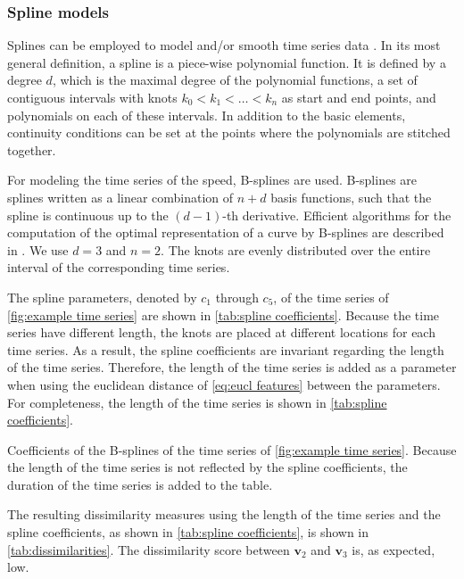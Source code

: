 \documentclass[10pt,final,a4paper,oneside,onecolumn]{article}
\newcommand{\profile}[1]{\textbf{v}_{#1}}
\theoremstyle{plain}\newtheorem{definition}{Definition}[section]    %
\theoremstyle{definition}\newtheorem{example}{Example}[section]     %
\theoremstyle{remark}\newtheorem{remarkenv}{Remark}[section]        %
\begin{document}
\subsubsection{Spline models}
\label{sec:spline models}

Splines can be employed to model and/or smooth time series data \cite{dierckx1993splines, deboor1978practical}. In its most general definition, a spline is a piece-wise polynomial function. It is defined by a degree $d$, which is the maximal degree of the polynomial functions, a set of contiguous intervals with knots $k_0 < k_1 < \ldots < k_n$ as start and end points, and polynomials on each of these intervals. In addition to the basic elements, continuity conditions can be set at the points where the polynomials are stitched together. 

For modeling the time series of the speed, B-splines are used. B-splines are splines written as a linear combination of $n+d$ basis functions, such that the spline is continuous up to the $(d-1)$-th derivative. Efficient algorithms for the computation of the optimal representation of a curve by B-splines are described in \cite{dierckx1993splines}. We use $d=3$ and $n=2$. The knots are evenly distributed over the entire interval of the corresponding time series.

The spline parameters, denoted by $c_1$ through $c_5$, of the time series of \cref{fig:example time series} are shown in \cref{tab:spline coefficients}. Because the time series have different length, the knots are placed at different locations for each time series. As a result, the spline coefficients are invariant regarding the length of the time series. Therefore, the length of the time series is added as a parameter when using the euclidean distance of \cref{eq:eucl features} between the parameters. For completeness, the length of the time series is shown in \cref{tab:spline coefficients}. 


\begin{table}
	\centering
	\caption{Coefficients of the B-splines of the time series of \cref{fig:example time series}. Because the length of the time series is not reflected by the spline coefficients, the duration of the time series is added to the table.}
	\label{tab:spline coefficients}
	
\end{table}

The resulting dissimilarity measures using the length of the time series and the spline coefficients, as shown in \cref{tab:spline coefficients}, is shown in \cref{tab:dissimilarities}. The dissimilarity score between $\profile{2}$ and $\profile{3}$ is, as expected, low.
\end{document}
